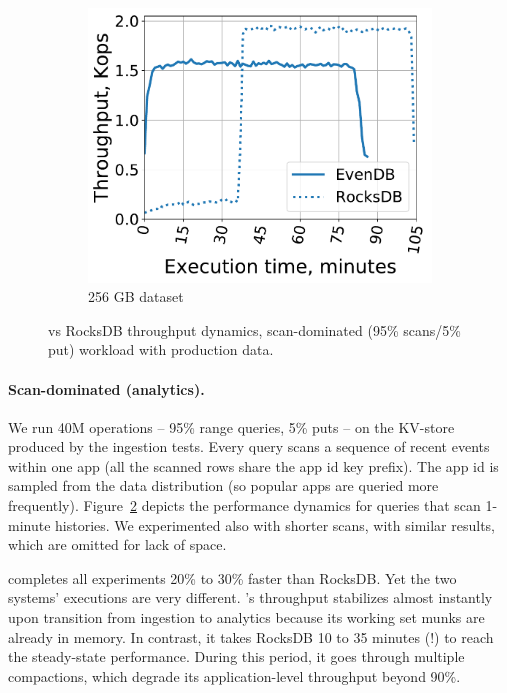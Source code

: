 \begin{figure}[tb]
\begin{subfigure}{0.32\linewidth}
\includegraphics[width=\textwidth]{figs/throughput_256_scans_10s_line.pdf}
\caption{256 GB dataset}
\label{fig:prod:analytics:c}
\end{subfigure}
\caption{\sys\/ vs RocksDB throughput dynamics,  scan-dominated (95\% scans/5\% put) workload with production data.}
\label{fig:prod:analytics}
\end{figure}

\paragraph{Scan-dominated (analytics).} We run 40M operations -- 95\% range queries, 5\% puts -- 
on the KV-store produced by the ingestion tests.
Every query scans a sequence of recent events within one app (all the scanned rows 
share the  app id key prefix).  
The app id is sampled from the data distribution (so popular apps are queried more frequently).  
Figure~\ref{fig:prod:analytics} depicts the performance dynamics for queries that scan 1-minute histories.
We experimented also with shorter scans, with similar results, which are omitted for lack of space.

\sys\/ completes all experiments 20\% to 30\% faster than RocksDB. 
Yet the two systems' executions are very different. \sys's throughput stabilizes 
almost instantly upon transition from ingestion to analytics because its working set munks are already 
in memory. In contrast, it takes RocksDB 10 to 35 minutes (!) to reach the steady-state performance. 
During this period, it goes through multiple compactions, which degrade its application-level throughput 
beyond 90\%. 

